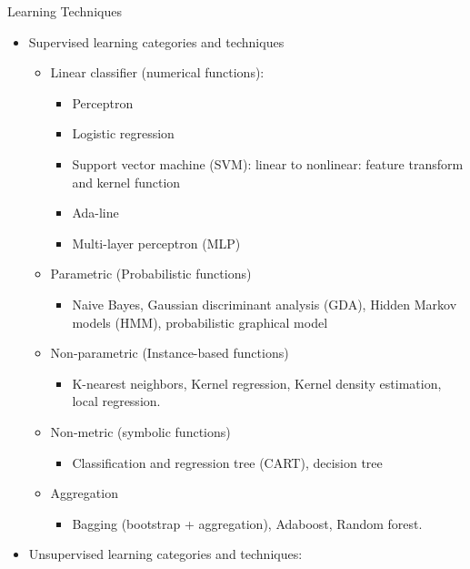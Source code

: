 \documentclass[
]{book}
\providecommand{\tightlist}{%
  \setlength{\itemsep}{0pt}\setlength{\parskip}{0pt}}
\begin{document}
Learning Techniques

\begin{itemize}
\item
  Supervised learning categories and techniques

  \begin{itemize}
  \item
    Linear classifier (numerical functions):

    \begin{itemize}
    \tightlist
    \item
      Perceptron
    \item
      Logistic regression
    \item
      Support vector machine (SVM): linear to nonlinear: feature transform and kernel function
    \item
      Ada-line
    \item
      Multi-layer perceptron (MLP)
    \end{itemize}
  \item
    Parametric (Probabilistic functions)

    \begin{itemize}
    \tightlist
    \item
      Naive Bayes, Gaussian discriminant analysis (GDA), Hidden Markov models (HMM), probabilistic graphical model
    \end{itemize}
  \item
    Non-parametric (Instance-based functions)

    \begin{itemize}
    \tightlist
    \item
      K-nearest neighbors, Kernel regression, Kernel density estimation, local regression.
    \end{itemize}
  \item
    Non-metric (symbolic functions)

    \begin{itemize}
    \tightlist
    \item
      Classification and regression tree (CART), decision tree
    \end{itemize}
  \item
    Aggregation

    \begin{itemize}
    \tightlist
    \item
      Bagging (bootstrap + aggregation), Adaboost, Random forest.
    \end{itemize}
  \end{itemize}
\item
  Unsupervised learning categories and techniques:


\end{itemize}
\end{document}
